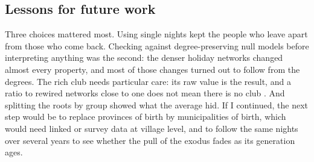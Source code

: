 \subsection{Lessons for future work}

Three choices mattered most. Using single nights kept the people who leave apart from those who come back. Checking against degree-preserving null models before interpreting anything was the second: the denser holiday networks changed almost every property, and most of those changes turned out to follow from the degrees. The rich club needs particular care: its raw value is the result, and a ratio to rewired networks close to one does not mean there is no club \citep{zhou2007structural}. And splitting the roots by group showed what the average hid. If I continued, the next step would be to replace provinces of birth by municipalities of birth, which would need linked or survey data at village level, and to follow the same nights over several years to see whether the pull of the exodus fades as its generation ages.
